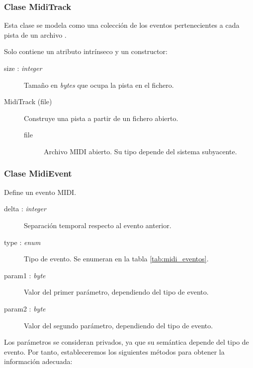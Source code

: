 \subsubsection{Clase MidiTrack}

Esta clase se modela como una colección de los eventos pertenecientes a cada pista de un archivo .

Solo contiene un atributo intrínseco y un constructor:

\begin{description}
	\item[size : \textit{integer}] Tamaño en \textit{bytes} que ocupa la pista en el fichero.
\end{description}

\begin{description}
	\item[MidiTrack (file)]
	Construye una pista a partir de un fichero abierto.
	
	\begin{description}
		\item[file] Archivo \acrshort{MIDI} abierto. Su tipo depende del sistema subyacente.
	\end{description}
\end{description}

\subsubsection{Clase MidiEvent}

Define un evento \acrshort{MIDI}.

\begin{description}
	\item[delta : \textit{integer}] Separación temporal respecto al evento anterior.
	\item[type : \textit{enum}] Tipo de evento. Se enumeran en la tabla \ref{tab:midi_eventos}.
	\item[param1 : \textit{byte}] Valor del primer parámetro, dependiendo del tipo de evento.
	\item[param2 : \textit{byte}] Valor del segundo parámetro, dependiendo del tipo de evento.
\end{description}

Los parámetros se consideran privados, ya que su semántica depende del tipo de evento. Por tanto, estableceremos los siguientes métodos para obtener la información adecuada:

